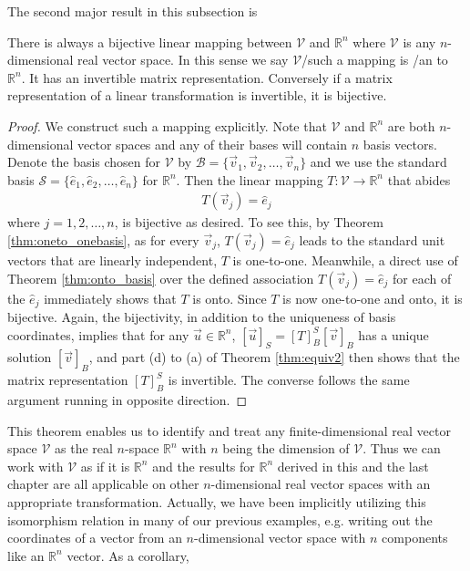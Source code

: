 The second major result in this subsection is
\begin{thm}
\label{thm:isomorphism}
There is always a bijective linear mapping between $\mathcal{V}$ and $\mathbb{R}^n$ where $\mathcal{V}$ is any $n$-dimensional real vector space. In this sense we say $\mathcal{V}$/such a mapping is /an  to $\mathbb{R}^n$. It has an invertible matrix representation. Conversely if a matrix representation of a linear transformation is invertible, it is bijective.
\end{thm}
\begin{proof}
We construct such a mapping explicitly. Note that $\mathcal{V}$ and $\mathbb{R}^n$ are both $n$-dimensional vector spaces and any of their bases will contain $n$ basis vectors. Denote the basis chosen for $\mathcal{V}$ by $\mathcal{B} = \{\vec{v}_1, \vec{v}_2, \ldots, \vec{v}_n\}$ and we use the standard basis $\mathcal{S} = \{\hat{e}_1, \hat{e}_2, \ldots, \hat{e}_n\}$ for $\mathbb{R}^n$. Then the linear mapping $T: \mathcal{V} \to \mathbb{R}^n$ that abides
\begin{align*}
T(\vec{v}_j) = \hat{e}_j    
\end{align*}
where $j = 1,2,\ldots,n$, is bijective as desired. To see this, by Theorem \ref{thm:oneto_onebasis}, as for every $\vec{v}_j$, $T(\vec{v}_j) = \hat{e}_j$ leads to the standard unit vectors that are linearly independent, $T$ is one-to-one. Meanwhile, a direct use of Theorem \ref{thm:onto_basis} over the defined association $T(\vec{v}_j) = \hat{e}_j$ for each of the $\hat{e}_j$ immediately shows that $T$ is onto. Since $T$ is now one-to-one and onto, it is bijective. Again, the bijectivity, in addition to the uniqueness of basis coordinates, implies that for any $\vec{u} \in \mathbb{R}^n$, $[\vec{u}]_S = [T]_B^S[\vec{v}]_B$ has a unique solution $[\vec{v}]_B$, and part (d) to (a) of Theorem \ref{thm:equiv2} then shows that the matrix representation $[T]_B^S$ is invertible. The converse follows the same argument running in opposite direction.
\end{proof}
This theorem enables us to identify and treat any finite-dimensional real vector space $\mathcal{V}$ as the real $n$-space $\mathbb{R}^n$ with $n$ being the dimension of $\mathcal{V}$. Thus we can work with $\mathcal{V}$ as if it is $\mathbb{R}^n$ and the results for $\mathbb{R}^n$ derived in this and the last chapter are all applicable on other $n$-dimensional real vector spaces with an appropriate transformation. Actually, we have been implicitly utilizing this isomorphism relation in many of our previous examples, e.g. writing out the coordinates of a vector from an $n$-dimensional vector space with $n$ components like an $\mathbb{R}^n$ vector. As a corollary,
